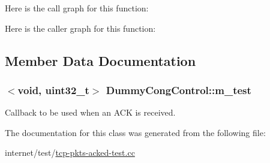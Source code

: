 Here is the call graph for this function\+:




Here is the caller graph for this function\+:




\subsection{Member Data Documentation}
\subsubsection[{\texorpdfstring{m\+\_\+test}{m_test}}]{$<$void, uint32\+\_\+t$>$ Dummy\+Cong\+Control\+::m\+\_\+test\hspace{0.3cm}{\ttfamily [private]}}\hypertarget{classDummyCongControl_a49d166e2939e240bd6de5d778871e067}{}\label{classDummyCongControl_a49d166e2939e240bd6de5d778871e067}


Callback to be used when an A\+CK is received. 



The documentation for this class was generated from the following file\+:\begin{DoxyCompactItemize}
\item 
internet/test/\hyperlink{tcp-pkts-acked-test_8cc}{tcp-\/pkts-\/acked-\/test.\+cc}\end{DoxyCompactItemize}
